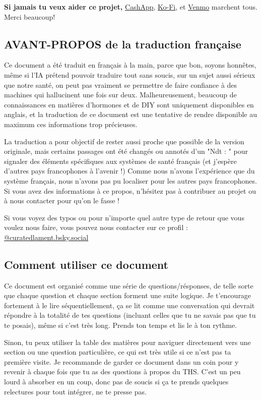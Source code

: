 \documentclass{article}
\begin{document}
\textbf{Si jamais tu veux aider ce projet,} \href{https://cash.app/Katitties}{CashApp}, \href{https://ko-fi.com/katitties}{Ko-Fi}, et \href{https://account.venmo.com/u/katitties}{Venmo} marchent tous. Merci beaucoup!

\subsection{AVANT-PROPOS de la traduction française}

Ce document a été traduit en français à la main, parce que bon, soyons honnêtes, même si l'IA prétend pouvoir traduire tout sans soucis, sur un sujet aussi sérieux que notre santé, on peut pas vraiment se permettre de faire confiance à des machines qui hallucinent une fois sur deux. 
Malheureusement, beaucoup de connaissances en matières d'hormones et de DIY sont uniquement disponibles en anglais, et la traduction de ce document est une tentative de rendre disponible au maximum ces informations trop précieuses.

La traduction a pour objectif de rester aussi proche que possible de la version originale, mais certains passages ont été changés ou annotés d'un "Ndt : " pour signaler des éléments spécifiques aux systèmes de santé français (et j'espère d'autres pays francophones à l'avenir !) 
Comme nous n'avons l'expérience que du système français, nous n'avons pas pu localiser pour les autres pays francophones. Si vous avez des informations à ce propos, n'hésitez pas à contribuer au projet ou à nous contacter pour qu'on le fasse !

Si vous voyez des typos ou pour n'importe quel autre type de retour que vous voulez nous faire, vous pouvez nous contacter sur ce profil : \href{https://bsky.app/profile/curatedlament.bsky.social}{@curatedlament.bsky.social}

\subsection*{Comment utiliser ce document}

Ce document est organisé comme une série de questions/résponses, de telle sorte que chaque question et chaque section forment une suite logique. Je t'encourage fortement à le lire séquentiellement, ça se lit comme une conversation qui devrait répondre à la totalité de tes questions (incluant celles que tu ne savais pas que tu te posais), même si c'est très long. Prends ton temps et lis le à ton rythme. 

Sinon, tu peux utiliser la table des matières pour naviguer directement vers une section ou une question particulière, ce qui est très utile si ce n'est pas ta première visite. Je recommande de garder ce document dans un coin pour y revenir à chaque fois que tu as des questions à propos du THS. C'est un peu lourd à absorber en un coup, donc pas de soucis si ça te prends quelques relectures pour tout intégrer, ne te presse pas. 
\end{document}
